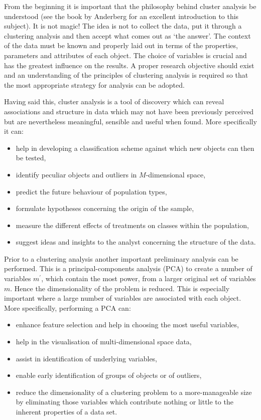 From the beginning it is important that the philosophy behind cluster
analysis be understood (see the book by Anderberg for an excellent
introduction to this subject). It is not magic! The idea is not to
collect the data, put it through a clustering analysis
and then accept what comes out as `the answer'.
The context of the data must be known and properly laid out in terms of
the properties, parameters and attributes of each object. The choice of
variables is crucial and has the greatest influence on the results. 
A proper research objective should exist and an understanding of the
principles of clustering analysis is required so that the most
appropriate strategy for analysis can be adopted. 

Having said this, cluster analysis is a tool of discovery which can reveal 
associations and structure in data which may not have been previously perceived
but are nevertheless meaningful, sensible and useful when found. More 
specifically it can:
\begin{itemize}
\item help in developing a classification scheme against which new 
objects can then be tested,
\item identify peculiar objects and outliers in $M$-dimensional space,
\item predict the future behaviour of population types,
\item formulate hypotheses concerning the origin of the sample,
\item measure the different effects of treatments on classes within the 
population, 
\item  suggest ideas and insights to the analyst concerning the structure 
of the data.
\end{itemize}
Prior to a clustering analysis another important preliminary analysis can be 
performed. This is a principal-components analysis (PCA) to create a number of
variables $m^{\prime}$, which contain the most power, from a larger original 
set of variables $m$. Hence the dimensionality of the problem is reduced. 
This is especially important where a large number of variables are associated 
with each object. More specifically, performing a PCA can:
\begin{itemize}
\item enhance feature selection and help in choosing the most useful variables,
\item help in the visualisation of multi-dimensional space data,
\item assist in identification of underlying variables,
\item enable early identification of groups of objects or of outliers, 
\item reduce the dimensionality of a clustering problem to a more-manageable
size by eliminating those variables which contribute nothing or little to the
inherent properties of a data set.
\end{itemize}

